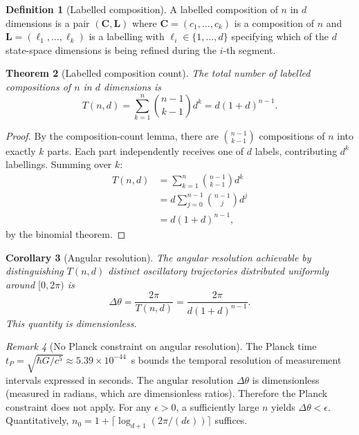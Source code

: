 \documentclass[11pt,twocolumn,a4paper]{article}
\newtheorem{theorem}{Theorem}[section]
\newtheorem{corollary}[theorem]{Corollary}
\theoremstyle{definition}
\newtheorem{definition}[theorem]{Definition}
\theoremstyle{remark}
\newtheorem{remark}[theorem]{Remark}
\newcommand{\Gnewton}{G}
\begin{document}
\begin{definition}[Labelled composition]
A labelled composition of $n$ in $d$ dimensions is a pair $(\mathbf{C}, \mathbf{L})$ where $\mathbf{C} = (c_1, \ldots, c_k)$ is a composition of $n$ and $\mathbf{L} = (\ell_1, \ldots, \ell_k)$ is a labelling with $\ell_i \in \{1, \ldots, d\}$ specifying which of the $d$ state-space dimensions is being refined during the $i$-th segment.
\end{definition}

\begin{theorem}[Labelled composition count]\label{thm:inflation}
The total number of labelled compositions of $n$ in $d$ dimensions is
\begin{equation}
T(n,d) = \sum_{k=1}^n \binom{n-1}{k-1} d^k = d(1+d)^{n-1}.
\end{equation}
\end{theorem}

\begin{proof}
By the composition-count lemma, there are $\binom{n-1}{k-1}$ compositions of $n$ into exactly $k$ parts. Each part independently receives one of $d$ labels, contributing $d^k$ labellings. Summing over $k$:
\begin{align}
T(n,d) &= \sum_{k=1}^n \binom{n-1}{k-1} d^k\\
&= d \sum_{j=0}^{n-1} \binom{n-1}{j} d^j\\
&= d(1+d)^{n-1},
\end{align}
by the binomial theorem.
\end{proof}

\begin{corollary}[Angular resolution]\label{cor:angular}
The angular resolution achievable by distinguishing $T(n,d)$ distinct oscillatory trajectories distributed uniformly around $[0, 2\pi)$ is
\begin{equation}
\Delta\theta = \frac{2\pi}{T(n,d)} = \frac{2\pi}{d(1+d)^{n-1}}.
\end{equation}
This quantity is dimensionless.
\end{corollary}

\begin{remark}[No Planck constraint on angular resolution]\label{rem:planck}
The Planck time $t_P = \sqrt{\hbar\Gnewton/c^5} \approx 5.39 \times 10^{-44}$~s bounds the temporal resolution of measurement intervals expressed in seconds. The angular resolution $\Delta\theta$ is dimensionless (measured in radians, which are dimensionless ratios). Therefore the Planck constraint does not apply. For any $\epsilon > 0$, a sufficiently large $n$ yields $\Delta\theta < \epsilon$. Quantitatively, $n_0 = 1 + \lceil \log_{d+1}(2\pi/(d\epsilon)) \rceil$ suffices.
\end{remark}
\end{document}
